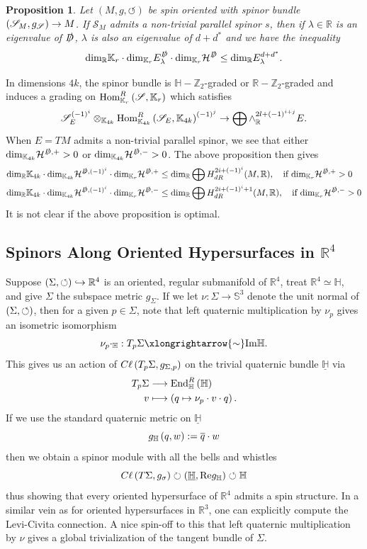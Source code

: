 \documentclass[openany, 11pt]{article}
\newtheorem{proposition}[theorem]{Proposition}
\theoremstyle{definition}
\theoremstyle{remark}
\def\lp{\ensuremath{\left(}}
\def\rp{\ensuremath{\right)}}
\def\H{\ensuremath{\mathcal{H}}}
\def\Sc{\ensuremath{\mathscr{S}}}
\def\cal{\ensuremath{\boldsymbol{\circlearrowleft}}}
\def\bH{\ensuremath{\mathbb{H}}}
\def\bR{\ensuremath{\mathbb{R}}}
\def\bZ{\ensuremath{\mathbb{Z}}}
\def\bK{\ensuremath{\mathbb{K}}}
\def\bS{\ensuremath{\mathbb{S}}}
\def\End{\ensuremath{\textnormal{End}}}
\def\Hom{\ensuremath{\textnormal{Hom}}}
\def\dim{\ensuremath{\textnormal{dim}}}
\begin{document}
\begin{proposition}
    Let $(M,g,\cal)$ be spin oriented with spinor bundle $\lp\Sc_M,g_{\Sc}\rp\rightarrow M$. If $\Sc_M$ admits a non-trivial parallel spinor $s$, then if $\lambda\in\bR$ is an eigenvalue of $\slashed{D}$, $\lambda$ is also an eigenvalue of $d+d^*$ and we have the inequality
    \[
        \textup{dim}_{\bR}\bK_r\cdot\textup{dim}_{\bK_r}E^{\slashed{D}}_{\lambda}\cdot\textup{dim}_{\bK_r}\H^{\slashed{D}}\leq \textup{dim}_{\bR}E^{d+d^*}_{\lambda}.
    \]
\end{proposition}
In dimensions $4k$, the spinor bundle is $\bH-\bZ_2$-graded or $\bR-\bZ_2$-graded and induces a grading on $\Hom^R_{\bK_r}\lp\Sc,\bK_r\rp$ which satisfies
\[
    \Sc_E^{(-1)^i}\otimes_{\bK_{4k}}\Hom^R_{\bK_{4k}}\lp\Sc_E,\bK_{4k}\rp^{(-1)^j}\rightarrow \bigoplus\wedge^{2l+(-1)^{i+j}}_{\bR}E.
\]
When $E=TM$ admits a non-trivial parallel spinor, we see that either $\text{dim}_{\bK_{4k}}\H^{\slashed{D},+}>0$ or $\text{dim}_{\bK_{4k}}\H^{\slashed{D},-}>0$. The above proposition then gives
\begin{align*}
    \text{dim}_{\bR}\bK_{4k}\cdot\text{dim}_{\bK_{4k}}\H^{\slashed{D},(-1)^i}\cdot\text{dim}_{\bK_r}\H^{\slashed{D},+}&\leq \dim_{\bR}\bigoplus H^{2i+(-1)^i}_{dR}(M,\bR),\quad \text{if }\text{dim}_{\bK_r}\H^{\slashed{D},+}>0\\
    \text{dim}_{\bR}\bK_{4k}\cdot\text{dim}_{\bK_{4k}}\H^{\slashed{D},(-1)^i}\cdot\text{dim}_{\bK_r}\H^{\slashed{D},-}&\leq \dim_{\bR}\bigoplus H^{2i+(-1)^i+1}_{dR}(M,\bR),\quad \text{if }\text{dim}_{\bK_r}\H^{\slashed{D},-}>0
\end{align*}
It is not clear if the above proposition is optimal. 
\subsection*{Spinors Along Oriented Hypersurfaces in $\bR^4$}
Suppose $\lp\Sigma,\cal\rp\hookrightarrow\bR^4$ is an oriented, regular submanifold of $\bR^4$, treat $\bR^4\simeq\bH$, and give $\Sigma$ the subspace metric $g_{\Sigma}$. If we let $\nu:\Sigma\rightarrow\bS^3$ denote the unit normal of $\lp\Sigma,\cal\rp$, then for a given $p\in\Sigma$, note that left quaternic multiplication by $\nu_p$ gives an isometric isomorphism
\[
    \nu_p\cdot_{\bH}:T_p\Sigma\xlongrightarrow{\sim}\text{Im}\bH.
\]
This gives us an action of $C\ell\lp T_p\Sigma,g_{\Sigma,p}\rp$ on the trivial quaternic bundle $\underline{\bH}$ via
\begin{align*}
    T_p\Sigma&\longrightarrow \End^R_{\bH}\lp\bH\rp\\
    v&\longmapsto\lp q\mapsto \nu_p\cdot v\cdot q\rp.
\end{align*}
If we use the standard quaternic metric on $\underline{\bH}$
\[
    g_{\bH}\lp q,w\rp:=\overline{q}\cdot w
\]
then we obtain a spinor module with all the bells and whistles
\[
    C\ell\lp T\Sigma,g_{\sigma}\rp\circlearrowright\lp\underline{\bH},\text{Re}g_{\bH}\rp\circlearrowleft\bH
\]
thus showing that every oriented hypersurface of $\bR^4$ admits a spin structure. In a similar vein as for oriented hypersurfaces in $\bR^3$, one can explicitly compute the Levi-Civita connection. A nice spin-off to this that left quaternic multiplication by $\nu$ gives a global trivialization of the tangent bundle of $\Sigma$.
\end{document}
